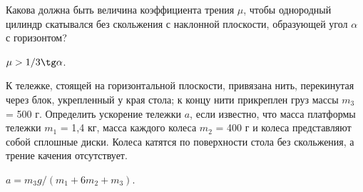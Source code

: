 \begin{ex} %
Какова должна быть величина коэффициента трения $\mu$, чтобы однородный цилиндр скатывался без скольжения с наклонной плоскости, образующей угол $\alpha$ с горизонтом?
\begin{ans}
$\mu > 1/3 \tg \alpha$.
\end{ans}
\end{ex}	

\begin{ex} %
К тележке, стоящей на горизонтальной плоскости, привязана нить, перекинутая через блок, укрепленный у края стола; к концу нити прикреплен груз массы $m_3$ = 500 г. Определить ускорение тележки $a$, если известно, что масса платформы тележки $m_1$ = 1,4 кг, масса каждого колеса $m_2$ = 400 г и колеса представляют собой сплошные диски. Колеса катятся по поверхности стола без скольжения, а трение качения отсутствует.
\begin{ans}
$a = m_3g/(m_1 + 6m_2 +m_3)$.
\end{ans}
\end{ex}	

\clearpage